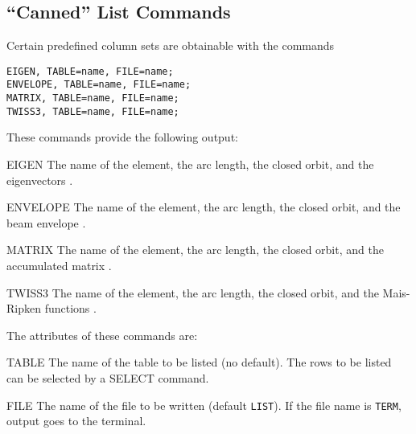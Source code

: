 \subsection{``Canned'' List Commands}
\label{sec:canned}
Certain predefined column sets are obtainable with the commands
\begin{verbatim}
EIGEN, TABLE=name, FILE=name;
ENVELOPE, TABLE=name, FILE=name;
MATRIX, TABLE=name, FILE=name;
TWISS3, TABLE=name, FILE=name;
\end{verbatim}
These commands provide the following output:
\begin{kdescription}
\item[EIGEN]
  The name of the element, the arc length, the closed orbit,
  and the eigenvectors .
\item[ENVELOPE]
  The name of the element, the arc length, the closed orbit,
  and the beam envelope .
\item[MATRIX]
  The name of the element, the arc length, the closed orbit,
  and the accumulated matrix .
\item[TWISS3]
  The name of the element, the arc length, the closed orbit,
  and the Mais-Ripken functions .
\end{kdescription}
The attributes of these commands are:
\begin{kdescription}
\item[TABLE]
  The name of the table to be listed (no default).
  The rows to be listed can be selected by a
  {SELECT}  command.
\item[FILE]
  The name of the file to be written (default \texttt{LIST}).
  If the file name is \texttt{TERM}, output goes to the terminal.
\end{kdescription}

